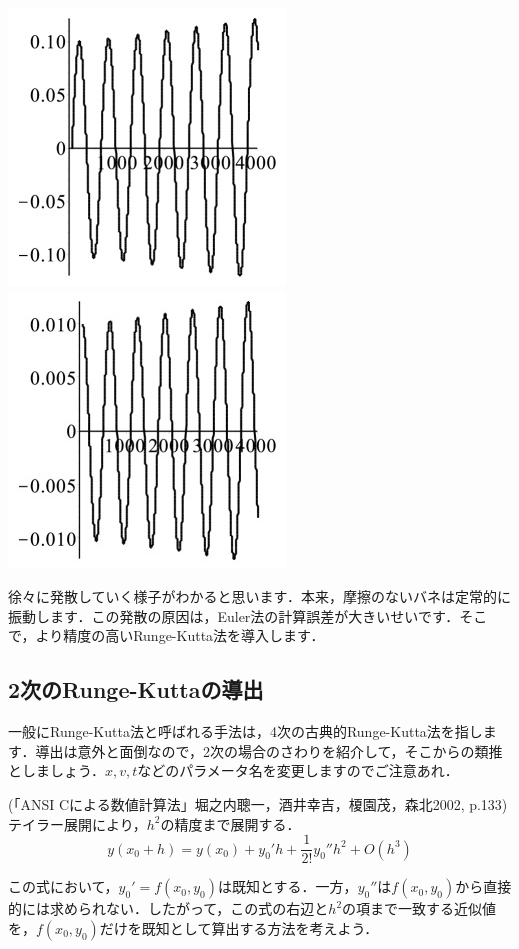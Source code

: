 \documentclass[11pt,dvipdfmx]{jsarticle}
\makeatletter
\def\maxwidth{\ifdim\Gin@nat@width>\linewidth\linewidth
    \else\Gin@nat@width\fi}
\let\Oldincludegraphics\includegraphics
\renewcommand{\includegraphics}[1]{\Oldincludegraphics[width=.8\maxwidth]{#1}}
\makeatother
\begin{document}
\includegraphics{../figs/springplot2d1.jpg}
\includegraphics{../figs/springplot2d2.jpg}

徐々に発散していく様子がわかると思います．本来，摩擦のないバネは定常的に振動します．この発散の原因は，Euler法の計算誤差が大きいせいです．そこで，より精度の高いRunge-Kutta法を導入します．

    \subsection{2次のRunge-Kuttaの導出}\label{ux6b21ux306erunge-kuttaux306eux5c0eux51fa}

一般にRunge-Kutta法と呼ばれる手法は，4次の古典的Runge-Kutta法を指します．導出は意外と面倒なので，2次の場合のさわりを紹介して，そこからの類推としましょう．\(x,v,t\)などのパラメータ名を変更しますのでご注意あれ．

(「ANSI Cによる数値計算法」堀之内聰一，酒井幸吉，榎園茂，森北2002,
p.133) テイラー展開により，\(h^2\)の精度まで展開する． \[
y(x_0+h) = y(x_0) +y_0'h+\frac{1}{2!}y_0''h^2 + O(h^3)
\]

この式において，\(y_0' = f(x_0,y_0)\)は既知とする．一方，\(y_0''\)は\(f(x_0,y_0)\)から直接的には求められない．したがって，この式の右辺と\(h^2\)の項まで一致する近似値を，\(f(x_0,y_0)\)だけを既知として算出する方法を考えよう．
\end{document}
